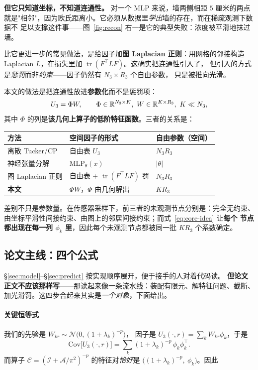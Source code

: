 \documentclass[11pt,a4paper]{article}
\begin{document}
\textbf{但它只知道坐标，不知道连通性。} 对一个 MLP 来说，墙两侧相距 $5$ 厘米的两点
就是"相邻"，因为欧氏距离小。它必须从数据里\emph{学出}墙的存在，而在稀疏观测下数据不
足以支撑这件事——图~\ref{fig:recon} 右一是它的典型失败：浓度被平滑地抹过墙。

比它更进一步的常见做法，是给因子加\textbf{图 Laplacian 正则}：用网格的邻接构造
Laplacian $L$，在损失里加 $\operatorname{tr}(F^\top LF)$。这确实把连通性引入了，
但引入的方式是\emph{惩罚}而非\emph{约束}——因子仍然有 $N_3\times R_3$ 个自由参数，
只是被推向光滑。

本文的做法是把连通性放进\textbf{参数化}而不是惩罚项：
\begin{equation}
U_3=\Phi W,\qquad \Phi\in\Rb^{N_3\times K},\ W\in\Rb^{K\times R_3},\ K\ll N_3,
\label{eq:core-idea}
\end{equation}
其中 $\Phi$ 的列是\textbf{该几何上算子的低阶特征函数}。三者的关系是：

\begin{center}
\begin{tabular}{@{}lll@{}}
\toprule
方法 & 空间因子的形式 & 自由参数（空间）\\
\midrule
离散 Tucker/CP & 自由表 $U_3$ & $N_3R_3$\\
神经张量分解 & $\mathrm{MLP}_\theta(x)$ & $|\theta|$\\
图 Laplacian 正则 & 自由表 $+$ $\operatorname{tr}(F^\top LF)$ 罚 & $N_3R_3$\\
\textbf{本文} & $\Phi W$，$\Phi$ 由几何解出 & $KR_3$\\
\bottomrule
\end{tabular}
\end{center}

差别不只是参数量。在传感器采样下，前三者的未观测节点分别是：完全无约束、
由坐标平滑性间接约束、由图上的邻居间接约束；而式~\eqref{eq:core-idea} 让\textbf{每个
节点都出现在每一列 $\phi_k$ 里}，因此每个未观测节点都被同一批 $KR_3$ 个系数确定。

\subsection{论文主线：四个公式}
\label{sec:four}

\S\ref{sec:model}--\S\ref{sec:predict} 按实现顺序展开，便于接手的人对着代码读。
\textbf{但论文正文不应该那样写}——那读起来像一条流水线：装配有限元、解特征问题、截断、
加光滑罚。这四步合起来其实是\emph{一个对象}，下面给出。

\paragraph{关键恒等式} 我们的先验是 $W_{kr}\sim\mathcal N\big(0,(1+\lambda_k)^{-p}\big)$，
因子是 $U_3(\cdot,r)=\sum_kW_{kr}\phi_k$，于是
\begin{equation}
\mathrm{Cov}\big[U_3(\cdot,r)\big]
=\sum_k(1+\lambda_k)^{-p}\,\phi_k\phi_k^\top .
\end{equation}
而算子 $\mathcal C=(\mathcal I+\mathcal A/\pi^2)^{-p}$ 的特征对\emph{恰好}是
$\big((1+\lambda_k)^{-p},\ \phi_k\big)$。因此
\end{document}
